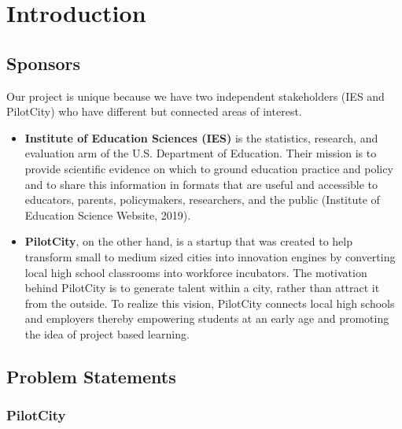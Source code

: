 
\chapter{Introduction}%
\label{sec:introduction}


\section{Sponsors} \label{background}

Our project is unique because we have two independent stakeholders (IES and PilotCity) who have different but connected areas of interest.
\begin{itemize}
    \item \textbf{Institute of Education Sciences (IES)} is the statistics, research, and evaluation arm of the U.S. Department of Education. Their mission is to provide scientific evidence on which to ground education practice and policy and to share this information in formats that are useful and accessible to educators, parents, policymakers, researchers, and the public (Institute of Education Science Website, 2019).
    \item \textbf{PilotCity}, on the other hand, is a startup that was created to help transform small to medium sized cities into innovation engines by converting local high school classrooms into workforce incubators. The motivation behind PilotCity is to generate talent within a city, rather than attract it from the outside. To realize this vision, PilotCity connects local high schools and employers thereby empowering students at an early age and promoting the idea of project based learning.
\end{itemize}

\section{Problem Statements}

\subsection{PilotCity}


